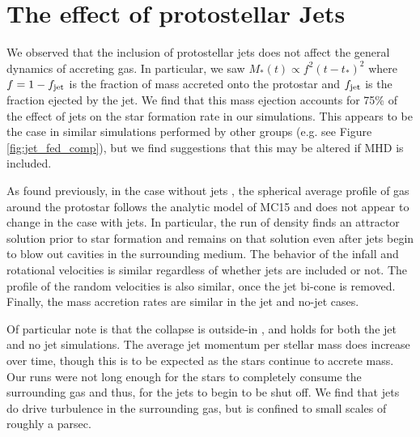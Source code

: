 \documentclass[../dissertation.tex]{subfiles}
\begin{document}
\section{The effect of protostellar Jets}

We observed that the inclusion of protostellar jets does not affect the general dynamics of accreting gas.
In particular, we saw $M_*(t) \propto f^2 (t-t_*)^2$ where $f = 1 - f_{\rm jet}$ is the fraction of mass accreted onto the protostar and $f_{\rm jet}$ is the fraction ejected by the jet.
We find that this mass ejection accounts for 75\% of the effect of jets on the star formation rate in our simulations.
This appears to be the case in similar simulations performed by other groups (e.g. see Figure \ref{fig:jet_fed_comp}), but we find suggestions that this may be altered if MHD is included.

As found previously, in the case without jets \citep{2017MNRAS.465.1316M}, 
the spherical average profile of gas around the protostar follows the analytic model of MC15 and does not appear to change in the case with jets.
In particular, the run of density finds an attractor solution prior to star formation and remains on that solution even after jets begin to blow out cavities in the surrounding medium.
The behavior of the infall and rotational velocities is similar regardless of whether jets are included or not.
The profile of the random velocities is also similar, once the jet bi-cone is removed.  Finally, the mass accretion rates are similar in the jet and no-jet cases.

Of particular note is that the collapse is outside-in  \citep{2017MNRAS.465.1316M}, and holds for both the jet and no jet simulations.
The average jet momentum per stellar mass does increase over time, though this is to be expected as the stars continue to accrete mass.
Our runs were not long enough for the stars to completely consume the surrounding gas and thus, for the jets to begin to be shut off.
We find that jets do drive turbulence in the surrounding gas, but is confined to small scales of roughly a parsec.
\end{document}
